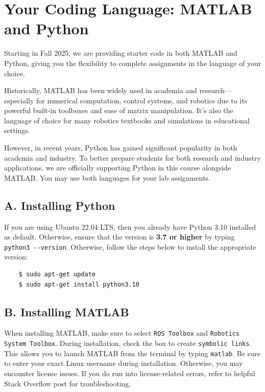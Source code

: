 \documentclass[hidelinks]{article}
\begin{document}
\section*{Your Coding Language: MATLAB and Python}

Starting in Fall 2025, we are providing starter code in both MATLAB and Python, giving you the flexibility to complete assignments in the language of your choice.

\vspace{0.1in}
Historically, MATLAB has been widely used in academia and research—especially for numerical computation, control systems, and robotics due to its powerful built-in toolboxes and ease of matrix manipulation. It’s also the language of choice for many robotics textbooks and simulations in educational settings.

\vspace{0.1in}
However, in recent years, Python has gained significant popularity in both academia and industry. To better prepare students for both research and industry applications, we are officially supporting Python in this course alongside MATLAB. You may use both languages for your lab assignments.


\subsection*{A. Installing Python}
If you are using Ubuntu 22.04 LTS, then you already have Python 3.10 installed as default. Otherwise, ensure that the version is \textbf{3.7 or higher} by typing \verb+python3 --version+. Otherwise, follow the steps below to install the appropriate version:
\begin{Verbatim}
    $ sudo apt-get update
    $ sudo apt-get install python3.10
\end{Verbatim}

\subsection*{B. Installing MATLAB}
When installing MATLAB, make sure to select \texttt{ROS Toolbox} and \texttt{Robotics System Toolbox}. During installation, check the box to create \verb+symbolic links+. This allows you to launch MATLAB from the terminal by typing \texttt{matlab}. Be sure to enter your exact Linux username during installation. Otherwise, you may encounter license issues. If you do run into license-related errors, refer to \href{https://stackoverflow.com/questions/62194208/activating-matlab-error-license-checkout-failed-license-manager-error-9}{\color{blue}{this}} helpful Stack Overflow post for troubleshooting.
\end{document}
